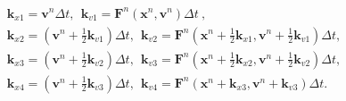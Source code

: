 \documentclass[10pt]{article}
\begin{document}
\begin{align*}& {\boldsymbol k}_{x1} = {\boldsymbol v}^{n} \Delta t, \ \  {\boldsymbol k}_{v1} = {\boldsymbol F}^{n} \left( {\boldsymbol x}^{n}, {\boldsymbol v}^{n} \right) \Delta t \ ,
 \\
& {\boldsymbol k}_{x2} = \left( {\boldsymbol v}^{n} + \frac{1}{2} {\boldsymbol k}_{v1} \right) \Delta t,
 \ \ 
{\boldsymbol k}_{v2} = {\boldsymbol F}^{n} \left( {\boldsymbol x}^{n} + \frac{1}{2} {\boldsymbol k}_{x1}, {\boldsymbol v}^{n} + \frac{1}{2} {\boldsymbol k}_{v1} \right) \Delta t , 
\\
& {\boldsymbol k}_{x3} = \left( {\boldsymbol v}^{n} + \frac{1}{2} {\boldsymbol k}_{v2} \right) \Delta t , 
\ \ 
{\boldsymbol k}_{v3} = {\boldsymbol F}^{n} \left( {\boldsymbol x}^{n} + \frac{1}{2} {\boldsymbol k}_{x2}, {\boldsymbol v}^{n} + \frac{1}{2} {\boldsymbol k}_{v2} \right) \Delta t , 
\\
&  {\boldsymbol k}_{x4} = \left( {\boldsymbol v}^{n} + \frac{1}{2} {\boldsymbol k}_{v3} \right) \Delta t , 
\ \
{\boldsymbol k}_{v4} = {\boldsymbol F}^{n} \left( {\boldsymbol x}^{n} + {\boldsymbol k}_{x3}, {\boldsymbol v}^{n} + {\boldsymbol k}_{v3} \right) \Delta t .\end{align*}
\end{document}
